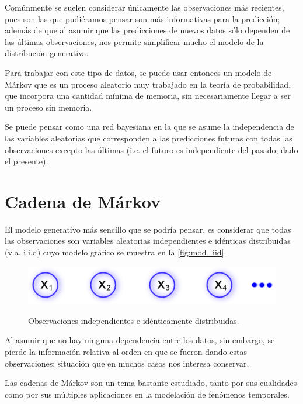 Comúnmente se suelen considerar únicamente las observaciones más recientes, pues son las que pudiéramos pensar son más informativas para la predicción; además de que al asumir que las predicciones de nuevos datos sólo dependen de las últimas observaciones, nos permite simplificar mucho el modelo de la distribución generativa.

Para trabajar con este tipo de datos, se puede usar entonces un modelo de Márkov que es un proceso aleatorio muy trabajado en la teoría de probabilidad, que incorpora una cantidad mínima de memoria, sin necesariamente llegar a ser un proceso sin memoria.

Se puede pensar como una red bayesiana en la que se asume la independencia de las variables aleatorias que corresponden a las predicciones futuras con todas las observaciones excepto las últimas (i.e. el futuro es independiente del pasado, dado el presente).

\section{Cadena de Márkov}


El modelo generativo más sencillo que se podría pensar, es considerar que todas las observaciones son variables aleatorias independientes e idénticas distribuidas (v.a. i.i.d) cuyo modelo gráfico se muestra en la \autoref{fig:mod_iid}.

\begin{figure}[tp]
        \myfloatalign
        {\includegraphics[width=0.6\linewidth]{gfx/chap3/mod-iid}}        
        \caption[Observaciones i.i.d.]{Observaciones independientes e idénticamente distribuidas.}
        \label{fig:mod_iid}
\end{figure}

Al asumir que no hay ninguna dependencia entre los datos, sin embargo, se pierde la información relativa al orden en que se fueron dando estas observaciones; situación que en muchos casos nos interesa conservar.

Las cadenas de Márkov son un tema bastante estudiado, tanto por sus cualidades como por sus múltiples aplicaciones en la modelación de fenómenos temporales. 

